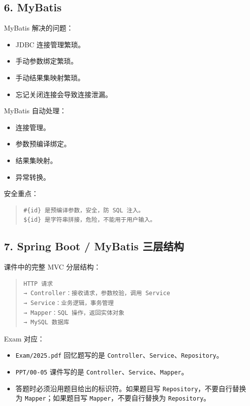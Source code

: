 \documentclass[UTF8,zihao=-4]{ctexart}
\begin{document}
\subsection{6. MyBatis}

MyBatis 解决的问题：

\begin{itemize}
\item JDBC 连接管理繁琐。
\item 手动参数绑定繁琐。
\item 手动结果集映射繁琐。
\item 忘记关闭连接会导致连接泄漏。
\end{itemize}

MyBatis 自动处理：

\begin{itemize}
\item 连接管理。
\item 参数预编译绑定。
\item 结果集映射。
\item 异常转换。
\end{itemize}

安全重点：

\begin{quote}
\footnotesize
\begin{verbatim}
#{id} 是预编译参数，安全，防 SQL 注入。
${id} 是字符串拼接，危险，不能用于用户输入。
\end{verbatim}
\end{quote}

\subsection{7. Spring Boot / MyBatis 三层结构}

课件中的完整 MVC 分层结构：

\begin{quote}
\footnotesize
\begin{verbatim}
HTTP 请求
→ Controller：接收请求，参数校验，调用 Service
→ Service：业务逻辑，事务管理
→ Mapper：SQL 操作，返回实体对象
→ MySQL 数据库
\end{verbatim}
\end{quote}

Exam 对应：

\begin{itemize}
\item \texttt{Exam/2025.pdf} 回忆题写的是 \texttt{Controller}、\texttt{Service}、\texttt{Repository}。
\item \texttt{PPT/00-05} 课件写的是 \texttt{Controller}、\texttt{Service}、\texttt{Mapper}。
\item 答题时必须沿用题目给出的标识符。如果题目写 \texttt{Repository}，不要自行替换为 \texttt{Mapper}；如果题目写 \texttt{Mapper}，不要自行替换为 \texttt{Repository}。
\end{itemize}
\end{document}
